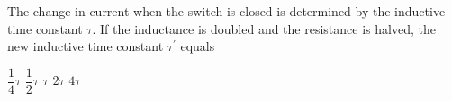 \begin{questions}\setcounter{question}{30}\question
The change in current when the switch is closed is determined by the inductive time constant $\tau$. If the inductance is doubled and the resistance is halved, the new inductive time constant $\tau^{\prime}$ equals

\begin{oneparchoices}
\choice $\dfrac{1}{4} \tau$
\choice $\dfrac{1}{2} \tau$
\choice $\tau$
\choice $2 \tau$
\choice $4 \tau$
\end{oneparchoices}\end{questions}

